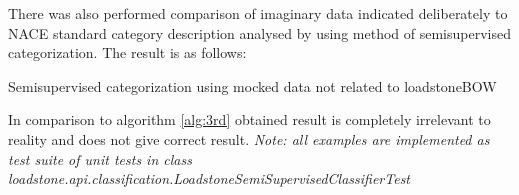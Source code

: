 \newline
There was also performed comparison of imaginary data indicated deliberately to NACE standard category description analysed by using method of semisupervised categorization. The result is as follows:
\begin{algorithm}[h]
	
	\hfill \break
	\caption{Semisupervised categorization using mocked data not related to loadstoneBOW}
	\label{alg:8th}
\end{algorithm}
\newline
In comparison to algorithm \ref{alg:3rd} obtained result is completely irrelevant to reality and does not give correct result.
\newline 
\textit{Note: all examples are implemented as test suite of unit tests in class \newline loadstone.api.classification.LoadstoneSemiSupervisedClassifierTest}


